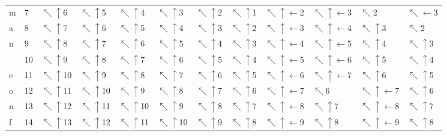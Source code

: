 \begin{tabular}{llllllllllll}
m &   7 &   $\nwarrow\uparrow$6 &    $\nwarrow\uparrow$5 &    $\nwarrow\uparrow$4 &    $\nwarrow\uparrow$3 &    $\nwarrow\uparrow$2 &    $\nwarrow\uparrow$1 &   $\nwarrow\uparrow\leftarrow$2 &  $\nwarrow\uparrow\leftarrow$3 &                     $\nwarrow$2 &           $\nwarrow\leftarrow$3 \\
a &   8 &   $\nwarrow\uparrow$7 &    $\nwarrow\uparrow$6 &    $\nwarrow\uparrow$5 &    $\nwarrow\uparrow$4 &    $\nwarrow\uparrow$3 &    $\nwarrow\uparrow$2 &   $\nwarrow\uparrow\leftarrow$3 &  $\nwarrow\uparrow\leftarrow$4 &             $\nwarrow\uparrow$3 &                     $\nwarrow$2 \\
n &   9 &   $\nwarrow\uparrow$8 &    $\nwarrow\uparrow$7 &    $\nwarrow\uparrow$6 &    $\nwarrow\uparrow$5 &    $\nwarrow\uparrow$4 &    $\nwarrow\uparrow$3 &   $\nwarrow\uparrow\leftarrow$4 &  $\nwarrow\uparrow\leftarrow$5 &             $\nwarrow\uparrow$4 &             $\nwarrow\uparrow$3 \\
  &  10 &   $\nwarrow\uparrow$9 &    $\nwarrow\uparrow$8 &    $\nwarrow\uparrow$7 &    $\nwarrow\uparrow$6 &    $\nwarrow\uparrow$5 &    $\nwarrow\uparrow$4 &   $\nwarrow\uparrow\leftarrow$5 &  $\nwarrow\uparrow\leftarrow$6 &             $\nwarrow\uparrow$5 &             $\nwarrow\uparrow$4 \\
c &  11 &  $\nwarrow\uparrow$10 &    $\nwarrow\uparrow$9 &    $\nwarrow\uparrow$8 &    $\nwarrow\uparrow$7 &    $\nwarrow\uparrow$6 &    $\nwarrow\uparrow$5 &   $\nwarrow\uparrow\leftarrow$6 &  $\nwarrow\uparrow\leftarrow$7 &             $\nwarrow\uparrow$6 &             $\nwarrow\uparrow$5 \\
o &  12 &  $\nwarrow\uparrow$11 &   $\nwarrow\uparrow$10 &    $\nwarrow\uparrow$9 &    $\nwarrow\uparrow$8 &    $\nwarrow\uparrow$7 &    $\nwarrow\uparrow$6 &   $\nwarrow\uparrow\leftarrow$7 &                    $\nwarrow$6 &   $\nwarrow\uparrow\leftarrow$7 &             $\nwarrow\uparrow$6 \\
n &  13 &  $\nwarrow\uparrow$12 &   $\nwarrow\uparrow$11 &   $\nwarrow\uparrow$10 &    $\nwarrow\uparrow$9 &    $\nwarrow\uparrow$8 &    $\nwarrow\uparrow$7 &   $\nwarrow\uparrow\leftarrow$8 &            $\nwarrow\uparrow$7 &   $\nwarrow\uparrow\leftarrow$8 &             $\nwarrow\uparrow$7 \\
f &  14 &  $\nwarrow\uparrow$13 &   $\nwarrow\uparrow$12 &   $\nwarrow\uparrow$11 &   $\nwarrow\uparrow$10 &    $\nwarrow\uparrow$9 &    $\nwarrow\uparrow$8 &   $\nwarrow\uparrow\leftarrow$9 &            $\nwarrow\uparrow$8 &   $\nwarrow\uparrow\leftarrow$9 &             $\nwarrow\uparrow$8 \\

\end{tabular}
